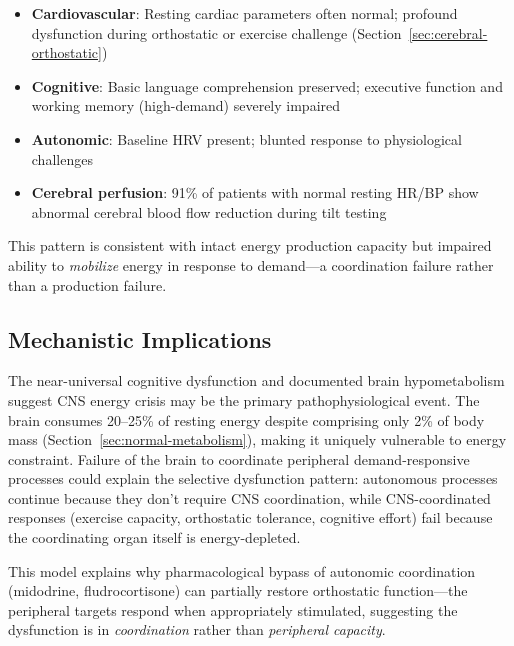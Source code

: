 \begin{itemize}
    \item \textbf{Cardiovascular}: Resting cardiac parameters often normal; profound dysfunction during orthostatic or exercise challenge (Section~\ref{sec:cerebral-orthostatic})
    \item \textbf{Cognitive}: Basic language comprehension preserved; executive function and working memory (high-demand) severely impaired~\cite{walitt2024deep}
    \item \textbf{Autonomic}: Baseline HRV present; blunted response to physiological challenges
    \item \textbf{Cerebral perfusion}: 91\% of patients with normal resting HR/BP show abnormal cerebral blood flow reduction during tilt testing~\cite{VanCampenEtAl2024}
\end{itemize}

This pattern is consistent with intact energy production capacity but impaired ability to \emph{mobilize} energy in response to demand---a coordination failure rather than a production failure.

\subsection{Mechanistic Implications}

\begin{speculation}
\label{spec:brain-energy-bottleneck}
The near-universal cognitive dysfunction and documented brain hypometabolism~\cite{Nakatomi2014neuroinflammation,walitt2024deep} suggest CNS energy crisis may be the primary pathophysiological event. The brain consumes 20--25\% of resting energy despite comprising only 2\% of body mass (Section~\ref{sec:normal-metabolism}), making it uniquely vulnerable to energy constraint. Failure of the brain to coordinate peripheral demand-responsive processes could explain the selective dysfunction pattern: autonomous processes continue because they don't require CNS coordination, while CNS-coordinated responses (exercise capacity, orthostatic tolerance, cognitive effort) fail because the coordinating organ itself is energy-depleted.

This model explains why pharmacological bypass of autonomic coordination (midodrine, fludrocortisone) can partially restore orthostatic function---the peripheral targets respond when appropriately stimulated, suggesting the dysfunction is in \emph{coordination} rather than \emph{peripheral capacity}.
\end{speculation}


